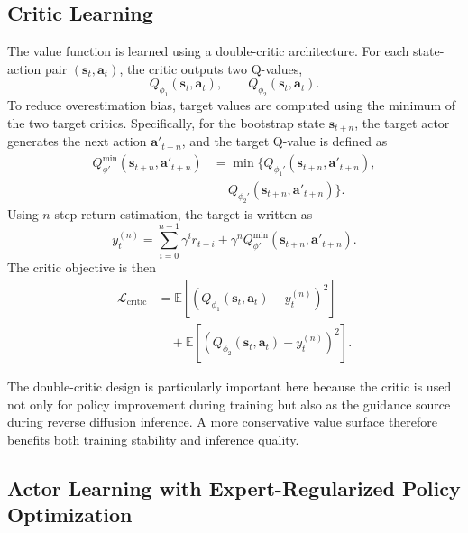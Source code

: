 \documentclass[lettersize,journal]{IEEEtran}
\theoremstyle{nonumberplain}     \theoremheaderfont{\bfseries\itshape}     \theorembodyfont{\normalfont}     \theoremseparator{:}     \theoremsymbol{\ensuremath{\blacksquare}}     \newtheorem{proof}{Proof}
\theoremstyle{plain}     \theoremheaderfont{\bfseries\itshape}     \theorembodyfont{\normalfont}     \theoremseparator{:}     \theoremsymbol{\ensuremath{\blacksquare}}     \newtheorem{remark}{Remark}
\begin{document}
\subsection{Critic Learning}

The value function is learned using a double-critic architecture. For each state-action pair $(\mathbf{s}_t,\mathbf{a}_t)$, the critic outputs two Q-values,
\begin{equation}
Q_{\phi_1}(\mathbf{s}_t,\mathbf{a}_t),
\qquad
Q_{\phi_2}(\mathbf{s}_t,\mathbf{a}_t).
\end{equation}
To reduce overestimation bias, target values are computed using the minimum of the two target critics\cite{fujimoto2018addressing}. Specifically, for the bootstrap state $\mathbf{s}_{t+n}$, the target actor generates the next action $\mathbf{a}'_{t+n}$, and the target Q-value is defined as
\begin{equation}
\begin{aligned}
Q_{\phi'}^{\min}(\mathbf{s}_{t+n},\mathbf{a}'_{t+n})
&= \min\Big\{ Q_{\phi_1'}(\mathbf{s}_{t+n},\mathbf{a}'_{t+n}), \\
&\quad\ Q_{\phi_2'}(\mathbf{s}_{t+n},\mathbf{a}'_{t+n}) \Big\}.
\end{aligned}
\end{equation}
Using $n$-step return estimation\cite{sutton2018reinforcement}, the target is written as
\begin{equation}
y_t^{(n)} = \sum_{i=0}^{n-1}\gamma^i r_{t+i} + \gamma^n Q_{\phi'}^{\min}(\mathbf{s}_{t+n},\mathbf{a}'_{t+n}).
\label{eq:nstep_target}
\end{equation}
The critic objective is then
\begin{equation}
\begin{aligned}
\mathcal{L}_{\mathrm{critic}} 
&= \mathbb{E}\left[\left(Q_{\phi_1}(\mathbf{s}_t,\mathbf{a}_t)-y_t^{(n)}\right)^2\right] \\
&\quad + \mathbb{E}\left[\left(Q_{\phi_2}(\mathbf{s}_t,\mathbf{a}_t)-y_t^{(n)}\right)^2\right].
\end{aligned}
\label{eq:critic_loss}
\end{equation}

The double-critic design is particularly important here because the critic is used not only for policy improvement during training but also as the guidance source during reverse diffusion inference. A more conservative value surface therefore benefits both training stability and inference quality.

\subsection{Actor Learning with Expert-Regularized Policy Optimization}
\end{document}
